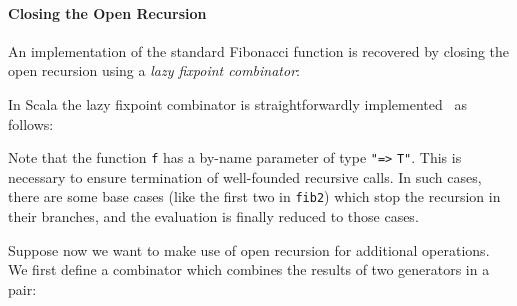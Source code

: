 \paragraph{Closing the Open Recursion} An implementation of
 the standard Fibonacci function is recovered by closing
the open recursion using a \emph{lazy fixpoint combinator}:


In Scala the lazy fixpoint combinator is straightforwardly implemented~\cite{} as follows:

\noindent Note that the function \lstinline{f} has a by-name parameter
of type \lstinline{"=>} \lstinline{T"}. This is necessary to ensure
termination of well-founded recursive calls. In such cases,
there are some base cases (like the first two in
\lstinline{fib2}) which stop the recursion in their branches, and the
evaluation is finally reduced to those cases.

\begin{comment}
If we close the recursion on \lstinline{fib2} only, the evaluation of \lstinline{fix(fib2)(2)}, namely the above \lstinline{x2} is processed as follows:
\begin{lstlisting}[language=Haskell,keywords={}]
   fix(fib2)(2)
= lazy val a = fib2(a); a.apply(2)
= lazy val a = fib2(a); fib2(a)(2)
= ... (the third case in fib2)
= lazy val a = fib2(a); a.apply(1) + a.apply(0)
= lazy val a = fib2(a); fib2(a)(1) + fib2(a)(0)
= ... (the first two cases in fib2)
= lazy val a = fib2(a); 1 + 0
= 1
\end{lstlisting}
which behaves similarly as \lstinline{fib(2)}. The process of evaluation will terminate if there are some base cases (like the first two in
\lstinline{fib2}) which stop the recursion in their branches, and the evaluation is finally reduced to those cases.
\end{comment}

Suppose now we want to make use of open recursion for additional operations. We first define a combinator which combines the results of two generators in a pair:

